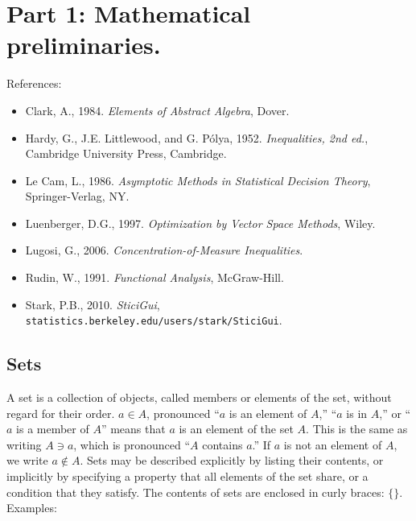 \date{Revised 4 November 2010\\
 ROUGH DRAFT! \\ Please report
errors to: {\tt stark [AT] stat [DOT] berkeley [DOT] edu}}


\begin{center}

\end{center}
\section{Part 1: Mathematical preliminaries.}

References:
\begin{itemize}
        \item Clark, A., 1984. {\em Elements of Abstract Algebra\/}, Dover.
        \item Hardy, G., J.E. Littlewood, and G. P\'{o}lya, 1952.
                {\em Inequalities, 2nd ed.\/}, Cambridge University Press, Cambridge.
        \item Le Cam, L., 1986. {\em Asymptotic Methods in Statistical Decision Theory\/},
                Springer-Verlag, NY.
        \item Luenberger, D.G., 1997. {\em Optimization by Vector Space Methods\/}, Wiley.
        \item Lugosi, G., 2006. {\em Concentration-of-Measure Inequalities\/}.
        \item Rudin, W., 1991. {\em Functional Analysis\/}, McGraw-Hill.
        \item Stark, P.B., 2010. {\em SticiGui\/}, {\tt statistics.berkeley.edu/users/stark/SticiGui}.
\end{itemize}

\subsection{Sets}
A set is a collection of objects, called members or elements of the set, without
regard for their order.
$a \in A$, pronounced ``$a$ is an element of $A$,''  ``$a$ is in $A$,'' or ``$a$ is a member of
$A$'' means that $a$ is an element of the set $A$.
This is the same as writing $A \ni a$, which is pronounced ``$A$ contains $a$.''
If $a$ is not an element of $A$, we write $a \not \in A$.
Sets may be described explicitly by listing their contents, or implicitly
by specifying a property that all elements of the set share, or a condition
that they satisfy.
The contents of sets are enclosed in curly braces: $\{ \}$.
Examples:

